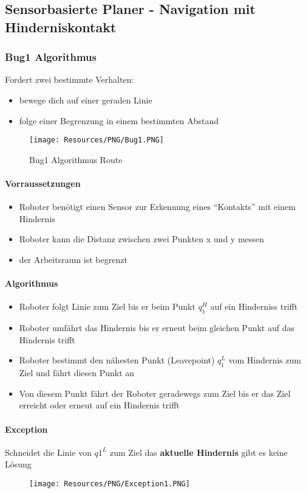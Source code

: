 \subsection{Sensorbasierte Planer - Navigation mit Hinderniskontakt}
\subsubsection{Bug1 Algorithmus}
Fordert zwei bestimmte Verhalten:
\begin{itemize}
	\item bewege dich auf einer geraden Linie
	\item folge einer Begrenzung in einem bestimmten Abstand
\end{itemize}
\begin{figure}[H]
	\begin{center}
		\texttt{[image: Resources/PNG/Bug1.PNG]}
		\caption{Bug1 Algorithmus Route}
		\label{fig:PNG/Bug1.png}
	\end{center}
\end{figure}
\paragraph{Vorraussetzungen}
\begin{itemize}
	\item Roboter benötigt einen Sensor zur Erkennung eines \enquote{Kontakts} mit einem Hindernis
	\item Roboter kann die Distanz zwischen zwei Punkten x und y messen
	\item der Arbeitsraum ist begrenzt
\end{itemize}
\paragraph{Algorithmus}
\begin{itemize}
	\item Roboter folgt Linie zum Ziel bis er beim Punkt $q_1^H$ auf ein Hinderniss trifft
	\item Roboter umfährt das Hindernis bis er erneut beim gleichen Punkt auf das Hindernis trifft
	\item Roboter bestimmt den nähesten Punkt (Leavepoint) $q_1^L$ vom Hindernis zum Ziel und fährt diesen Punkt an
	\item Von diesem Punkt fährt der Roboter geradewegs zum Ziel bis er das Ziel erreicht oder erneut auf ein Hindernis trifft
\end{itemize}
\paragraph{Exception}
Schneidet die Linie von $q1^L$ zum Ziel das \textbf{aktuelle Hindernis} gibt es keine Lösung
\begin{figure}[H]
	\begin{center}
		\texttt{[image: Resources/PNG/Exception1.PNG]}
		\caption{}
		\label{fig:PNG/Exception1.PNG}
	\end{center}
\end{figure}
